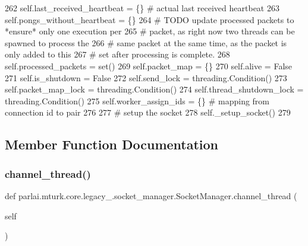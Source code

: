 \begin{DoxyCode}
262         self.last\_received\_heartbeat = \{\}  \textcolor{comment}{# actual last received heartbeat}
263         self.pongs\_without\_heartbeat = \{\}
264         \textcolor{comment}{# TODO update processed packets to *ensure* only one execution per}
265         \textcolor{comment}{# packet, as right now two threads can be spawned to process the}
266         \textcolor{comment}{# same packet at the same time, as the packet is only added to this}
267         \textcolor{comment}{# set after processing is complete.}
268         self.processed\_packets = set()
269         self.packet\_map = \{\}
270         self.alive = \textcolor{keyword}{False}
271         self.is\_shutdown = \textcolor{keyword}{False}
272         self.send\_lock = threading.Condition()
273         self.packet\_map\_lock = threading.Condition()
274         self.thread\_shutdown\_lock = threading.Condition()
275         self.worker\_assign\_ids = \{\}  \textcolor{comment}{# mapping from connection id to pair}
276 
277         \textcolor{comment}{# setup the socket}
278         self.\_setup\_socket()
279 
\end{DoxyCode}


\subsection{Member Function Documentation}
\mbox{\label{classparlai_1_1mturk_1_1core_1_1legacy__2018_1_1socket__manager_1_1SocketManager_a762590d50448509a5986c27a60dfea1a}} 
\subsubsection{\texorpdfstring{channel\+\_\+thread()}{channel\_thread()}}
{\footnotesize\ttfamily def parlai.\+mturk.\+core.\+legacy\+\_.\+socket\+\_\+manager.\+Socket\+Manager.\+channel\+\_\+thread (\begin{DoxyParamCaption}\item[{}]{self }\end{DoxyParamCaption})}

